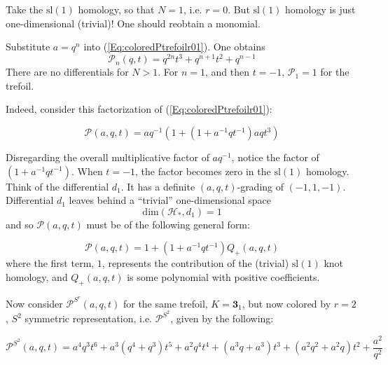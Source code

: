 \documentclass[a4paper,titlepage,twoside]{book}
\begin{document}
Take the $\text{sl}{ (1)}$ homology, so that $N=1$, i.e. $r=0$.  But $\text{sl}{(1)}$ homology is just one-dimensional (trivial)!  One should reobtain a monomial.  

Substitute $a=q^n$ into (\ref{Eq:coloredPtrefoilr01}).  One obtains
\[
\mathcal{P}_n{(q,t)} = q^{2n} t^3 + q^{n+1}t^2 + q^{n-1}
\]
There are no differentials for $N>1$.  For $n=1$, and then $t=-1$, $\mathcal{P}_1 =1$ for the trefoil.  

Indeed, consider this factorization of (\ref{Eq:coloredPtrefoilr01}):

\[
\mathcal{P}{(a,q,t)} = aq^{-1}( 1 + ( 1 + a^{-1}q t^{-1})aqt^3 )
\]

Disregarding the overall multiplicative factor of $aq^{-1}$, notice the factor of $(1+a^{-1}qt^{-1})$.  When $t=-1$, the factor becomes zero in the $\text{sl}{(1)}$ homology.  Think of the differential $d_1$.  It has a definite $(a,q,t)$-grading of $(-1,1,-1)$. Differential $d_1$ leaves behind a ``trivial'' one-dimensional space
\[
\text{dim}{ (\mathcal{H}_*, d_1)} = 1
\]
and so $\mathcal{P}{(a,q,t)}$ must be of the following general form:

\begin{equation}
  \mathcal{P}{ (a,q,t)} = 1 + ( 1 + a^{-1} qt^{-1})Q_+{ (a,q,t)}
\end{equation}
where the first term, $1$, represents the contribution of the (trivial) $\text{sl}{ (1)}$ knot homology, and $Q_+{ (a,q,t)}$ is some polynomial with positive coefficients.

Now consider $\mathcal{P}^{S^r}{ (a,q,t)}$ for the same trefoil, $K = \mathbf{3}_1$, but now colored by $r=2$, $S^2$ symmetric representation, i.e. $\mathcal{P}^{S^2}$, given by the following:

\begin{equation}
  \mathcal{P}^{ S^2  }{ (a,q,t) }  =   a^{4} q^{3} t^{6} + {a^3 \left( q^{4} +  q^{3}\right)} t^{5} + a^{2} q^{4} t^{4}  + {\left(a^{3} q + a^{3}\right)} t^{3} + {\left(a^{2} q^{2} + a^{2} q\right)} t^{2} + \frac{a^{2}}{q^{2}} \label{Eq:coloredPtrefoilr02}
\end{equation}
\end{document}
